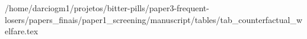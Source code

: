 /home/darciogm1/projetos/bitter-pills/paper3-frequent-losers/papers_finais/paper1_screening/manuscript/tables/tab_counterfactual_welfare.tex